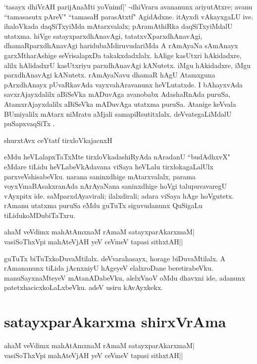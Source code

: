 `tasayx dhiVrAH parijAnaMti yoVnimf|' -dhiVraru avananunx ariyutAtxre; avanu ``tamasasutx pAreV" ``tamasaH parasAtxtf"\label{251} AgidAdxne. itAyxdi vAkayxgaLU ive. ihaloVkada daqSiTxyiMda mAtarxvalalx; pAramAthiRka daqSiTxyiMdalU utatxma. hiVge satayxparxdhAnavAgi, tatatxvXparxdhAnavAgi, dhamaRparxdhAnavAgi haridubaMdiruvudariMda A rAmAyaNa sAmAnayx garxMtharAshige seVrisalapxDa takakxdadxlalx. hAlige kasUtxri hAkidadxre, alilx hAlidadxrU kasUtxriyu parxdhAnavAgi kANutetx. iMgu hAkidadxre, iMgu parxdhAnavAgi kANutetx. rAmAyaNavu dhamaR hAgU Atamxguna pArxdhAnayx pUvaRkavAda vayxvahAravanunx heVLutatxde. I bAhayxvAda savxrAjayxdalilx aBiSeVka mADuvAga avanobabx AdashaRnAda puruSa, AtamxrAjayxdalilx aBiSeVka mADuvAga utatxma puruSa. Atanige keVvala BUmiyalilx mAtarx niMratu aMjali samapiRsutitxlalx. deVvategaLiMdalU puSapxvaqSiTx .

\begin{shloka}
shurxtAvx ceYtatf tirxloVkajacnxH\label{251b}
\end{shloka}
eMdu heVLalapxTaTxMte tirxloVkadashiRyAda nAradanU ``budAdhxvX" eMdare tiLidu heVLabeVkAdavana viSaya heVLalu tirxlokagaLalUlx parxveVshisabeVku. narana saninxdhige mAtarxvalalx, parama voyxVmaBAsakxranAda nArAyaNana saninxdhige hoVgi talupuvavaregU vAyxpitx ide. saMparxdAyavirali; ilalxdirali; adara viSaya hAge hoVgutetx. rAmanu utatxma puruSa eMdu guTuTx siguvudanunx QuSigaLu tiLidukoMDubiTaTxru.

\begin{shloka}
ahaM veVdimx mahAtAmxnaM rAmaM satayxparAkarxmaM|\label{251a}\\
vasiSoThxV\s pi mahAteVjAH yeV ceVmeV tapasi sithxtAH||
\end{shloka}

guTuTx biTuTxkoDuvaMtilalx. deVvarahasayx, horage biDuvaMtilalx. A rAmananunx tiLida jAcnxniyU hAgeyeV elalxroDane beretirabeVku. manuSayxnaMteyeV mAtanADabeVku, alelxVnoV oMdu dhavxni ide, adanunx patetxhacicxkoLaLxbeVku. adeV usiru kAvAyxkekx. 

\section*{satayxparAkarxma shirxVrAma}

\begin{shloka}
ahaM veVdimx mahAtAmxnaM rAmaM satayxparAkarxmaM|\\
vasiSoThxV\s pi mahAteVjAH yeV ceVmeV tapasi sithxtAH||
\end{shloka}

